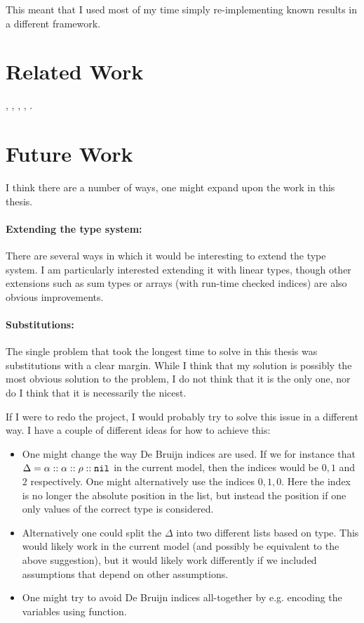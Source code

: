 This meant that I used most of my time simply re-implementing known results in a
different framework.

\section{Related Work}

\cite{TAL}, \cite{STAL}, \cite{untrusted}, \cite{ltal}, \cite{patina}.

\section{Future Work}

I think there are a number of ways, one might expand upon the work in this
thesis.

\paragraph{Extending the type system:}
There are several ways in which it would be interesting to extend the type
system. I am particularly interested extending it with linear types, though
other extensions such as sum types or arrays (with run-time checked indices) are
also obvious improvements.

\paragraph{Substitutions:}
The single problem that took the longest time to solve in this thesis was
substitutions with a clear margin. While I think that my solution is possibly
the most obvious solution to the problem, I do not think that it is the only
one, nor do I think that it is necessarily the nicest.

If I were to redo the project, I would probably try to solve this issue in a
different way. I have a couple of different ideas for how to achieve this:

\begin{itemize}
\item One might change the way De Bruijn indices are used. If we for instance
  that $\Delta = \alpha :: \alpha :: \rho :: \mathtt{nil}$ in the current model, then
  the indices would be $0, 1$ and $2$ respectively. One might alternatively use
  the indices $0, 1, 0$. Here the index is no longer the absolute position in
  the list, but instead the position if one only values of the correct type is
  considered.
\item Alternatively one could split the $\Delta$ into two different lists based
  on type. This would likely work in the current model (and possibly be
  equivalent to the above suggestion), but it would likely work differently if
  we included assumptions that depend on other assumptions.
\item One might try to avoid De Bruijn indices all-together by e.g. encoding the
  variables using function.
\end{itemize}

